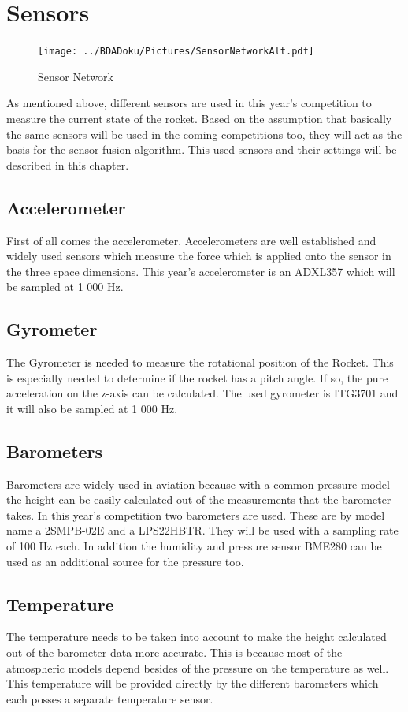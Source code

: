  \section{Sensors}
 \begin{figure}[h!]
  \centering
  \texttt{[image: ../BDADoku/Pictures/SensorNetworkAlt.pdf]}
  \caption{Sensor Network}
  \label{fig:SensorNetwork}
 \end{figure}

 As mentioned above, different sensors are used in this year's competition to measure the current state of the rocket. Based on the assumption
 that basically the same sensors will be used in the coming competitions too, they will act as the basis for the sensor fusion algorithm.
 This used sensors and their settings will be described in this chapter.

 \newpage
 \subsection{Accelerometer}
 First of all comes the accelerometer. Accelerometers are well established and widely used sensors which measure the force which is applied onto the sensor in the three space dimensions.
 This year's accelerometer is an ADXL357 which will be sampled at 1 000 Hz.

 \subsection{Gyrometer}
 The Gyrometer is needed to measure the rotational position of the Rocket. This is especially needed to determine if the rocket has a pitch angle. If so, the pure  acceleration on the z-axis can be calculated. The used gyrometer is ITG3701 and it will also be sampled at 1 000 Hz.

 \subsection{Barometers}
 Barometers are widely used in aviation because with a common pressure model the height can be easily calculated out of the measurements that the barometer takes.
 In this year's competition two barometers are used. These are by model name a 2SMPB-02E and a LPS22HBTR. They will be used with a sampling rate of 100 Hz each.
 In addition the humidity and pressure sensor BME280 can be used as an additional source for the pressure too.

 \subsection{Temperature}
 The temperature needs to be taken into account to make the height calculated out of the barometer data more accurate. This is because most of the atmospheric models depend besides of the pressure on the temperature as well.
 This temperature will be provided directly by the different barometers which each posses a separate temperature sensor.

